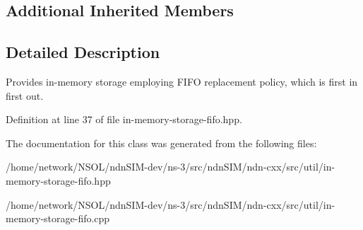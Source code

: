 \subsection*{Additional Inherited Members}


\subsection{Detailed Description}
Provides in-\/memory storage employing F\+I\+FO replacement policy, which is first in first out. 

Definition at line 37 of file in-\/memory-\/storage-\/fifo.\+hpp.



The documentation for this class was generated from the following files\+:\begin{DoxyCompactItemize}
\item 
/home/network/\+N\+S\+O\+L/ndn\+S\+I\+M-\/dev/ns-\/3/src/ndn\+S\+I\+M/ndn-\/cxx/src/util/in-\/memory-\/storage-\/fifo.\+hpp\item 
/home/network/\+N\+S\+O\+L/ndn\+S\+I\+M-\/dev/ns-\/3/src/ndn\+S\+I\+M/ndn-\/cxx/src/util/in-\/memory-\/storage-\/fifo.\+cpp\end{DoxyCompactItemize}

